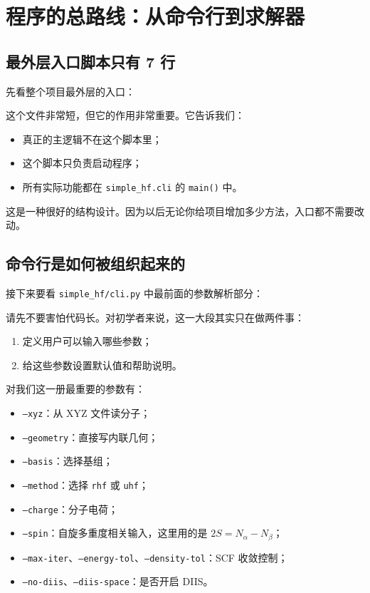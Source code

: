 \documentclass[UTF8,11pt,fontset=fandol]{ctexbook}
\begin{document}
\chapter{程序的总路线：从命令行到求解器}

\section{最外层入口脚本只有 7 行}

先看整个项目最外层的入口：



这个文件非常短，但它的作用非常重要。它告诉我们：

\begin{itemize}
  \item 真正的主逻辑不在这个脚本里；
  \item 这个脚本只负责启动程序；
  \item 所有实际功能都在 \texttt{simple\_hf.cli} 的 \texttt{main()} 中。
\end{itemize}

这是一种很好的结构设计。因为以后无论你给项目增加多少方法，入口都不需要改动。

\section{命令行是如何被组织起来的}

接下来要看 \texttt{simple\_hf/cli.py} 中最前面的参数解析部分：



请先不要害怕代码长。对初学者来说，这一大段其实只在做两件事：

\begin{enumerate}[label=\arabic*.]
  \item 定义用户可以输入哪些参数；
  \item 给这些参数设置默认值和帮助说明。
\end{enumerate}

对我们这一册最重要的参数有：
\begin{itemize}
  \item \texttt{--xyz}：从 XYZ 文件读分子；
  \item \texttt{--geometry}：直接写内联几何；
  \item \texttt{--basis}：选择基组；
  \item \texttt{--method}：选择 \texttt{rhf} 或 \texttt{uhf}；
  \item \texttt{--charge}：分子电荷；
  \item \texttt{--spin}：自旋多重度相关输入，这里用的是 $2S=N_\alpha-N_\beta$；
  \item \texttt{--max-iter}、\texttt{--energy-tol}、\texttt{--density-tol}：SCF 收敛控制；
  \item \texttt{--no-diis}、\texttt{--diis-space}：是否开启 DIIS。
\end{itemize}
\end{document}
